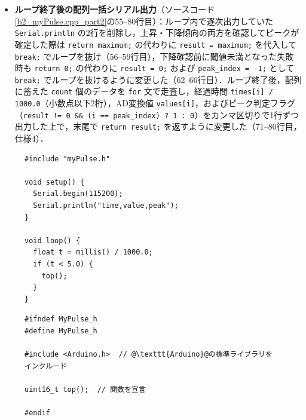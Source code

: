 \begin{itemize}
  \item \textbf{ループ終了後の配列一括シリアル出力}（ソースコード\ref{b2_myPulse.cpp_part2}の55--80行目）：ループ内で逐次出力していた \texttt{Serial.println} の2行を削除し，上昇・下降傾向の両方を確認してピークが確定した際は \texttt{return maximum;} の代わりに \texttt{result = maximum;} を代入して \texttt{break;} でループを抜け（56--59行目），下降確認前に閾値未満となった失敗時も \texttt{return 0;} の代わりに \texttt{result = 0;} および \texttt{peak\_index = -1;} として \texttt{break;} でループを抜けるように変更した（62--66行目）．ループ終了後，配列に蓄えた \texttt{count} 個のデータを \texttt{for} 文で走査し，経過時間 \texttt{times[i] / 1000.0}（小数点以下2桁），AD変換値 \texttt{values[i]}，およびピーク判定フラグ（\texttt{result != 0 \&\& (i == peak\_index) ? 1 : 0}）をカンマ区切りで1行ずつ出力した上で，末尾で \texttt{return result;} を返すように変更した（71--80行目，仕様4）．
\end{itemize}

\begin{figure}[H]
  \begin{lstlisting}[caption=b2\_peak\_detection.ino, label=b2_peak_detection, escapechar=\@]
#include "myPulse.h"

void setup() {
  Serial.begin(115200);
  Serial.println("time,value,peak");
}

void loop() {
  float t = millis() / 1000.0;
  if (t < 5.0) {
    top();
  }
}
    \end{lstlisting}
\end{figure}

\begin{figure}[H]
  \begin{lstlisting}[caption=myPulse.h, label=b2_myPulse.h, escapechar=\@]
#ifndef MyPulse_h
#define MyPulse_h

#include <Arduino.h>  // @\texttt{Arduino}@の標準ライブラリをインクルード

uint16_t top();  // 関数を宣言

#endif
    \end{lstlisting}
\end{figure}

